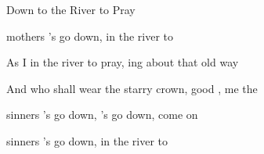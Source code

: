 \begin{SBSong}{Down to the River to Pray}
\begin{SBVerse}
     mothers 's go down,  in the river to  
  \end{SBVerse}
  \begin{SBVerse}
    As I  in the river to pray, ing about that  old way
    
    And who shall wear the starry crown, good , \WBLineBrk {} me the 
    
     sinners 's go down, 's go down, come on 
    
     sinners 's go down,  in the river to  
  \end{SBVerse}
\end{SBSong}
